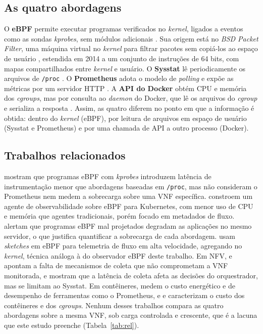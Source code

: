 \documentclass{ieeeaccess}
\let\citeonline\cite  %
\begin{document}
\subsection{As quatro abordagens}
O \textbf{eBPF} permite executar programas verificados no \textit{kernel}, ligados a eventos como as sondas \textit{kprobes}, sem módulos adicionais \cite{gregg_bpf_2019,linux_bpf_docs}. Sua origem está no \textit{BSD Packet Filter}, uma máquina virtual no \textit{kernel} para filtrar pacotes sem copiá-los ao espaço de usuário \cite{260309}, estendida em 2014 a um conjunto de instruções de 64 bits, com mapas compartilhados entre \textit{kernel} e usuário. O \textbf{Sysstat} lê periodicamente os arquivos de \texttt{/proc} \cite{godard2024sysstat}. O \textbf{Prometheus} adota o modelo de \textit{polling} e expõe as métricas por um servidor HTTP \cite{turnbull_prometheus_2018}. A \textbf{API do Docker} obtém CPU e memória dos \textit{cgroups}, mas por consulta ao \textit{daemon} do Docker, que lê os arquivos do \textit{cgroup} e serializa a resposta \cite{kernel_cgroup_v2,docker_runmetrics}. Assim, as quatro diferem no ponto em que a informação é obtida: dentro do \textit{kernel} (eBPF), por leitura de arquivos em espaço de usuário (Sysstat e Prometheus) e por uma chamada de API a outro processo (Docker).

\subsection{Trabalhos relacionados}
\citeonline{10.1109/NOMS47738.2020.9110434} mostram que programas eBPF com \textit{kprobes} introduzem latência de instrumentação menor que abordagens baseadas em \texttt{/proc}, mas não consideram o Prometheus nem medem a sobrecarga sobre uma VNF específica. \citeonline{kannan2024designing} constroem um agente de observabilidade sobre eBPF para Kubernetes, com menor uso de CPU e memória que agentes tradicionais, porém focado em metadados de fluxo. \citeonline{shahinfar2025demystifying} alertam que programas eBPF mal projetados degradam as aplicações no mesmo servidor, o que justifica quantificar a sobrecarga de cada abordagem. \citeonline{10.1145/3594255.3594256} usam \textit{sketches} em eBPF para telemetria de fluxo em alta velocidade, agregando no \textit{kernel}, técnica análoga à do observador eBPF deste trabalho. Em NFV, \citeonline{10.23919} e \citeonline{oliveira_observability_2026} apontam a falta de mecanismos de coleta que não comprometam a VNF monitorada, e mostram que a latência de coleta afeta as decisões do orquestrador, mas se limitam ao Sysstat. Em contêineres, \citeonline{dinga2023empirical} medem o custo energético e de desempenho de ferramentas como o Prometheus, e \citeonline{casalicchio2017measuring} e \citeonline{wiedner2023cgroups} caracterizam o custo dos contêineres e dos \textit{cgroups}. Nenhum desses trabalhos compara as quatro abordagens sobre a mesma VNF, sob carga controlada e crescente, que é a lacuna que este estudo preenche (Tabela~\ref{tab:rel}).
\end{document}
